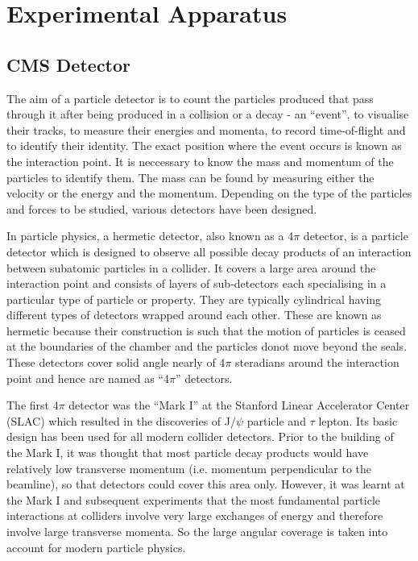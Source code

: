\chapter{Experimental Apparatus}
\label{chap:detector}
\section{CMS Detector}
The aim of a particle detector is to count the particles produced that pass through it after being produced in a collision or a decay - an ``event'', to visualise their tracks, to measure their energies and momenta, to record time-of-flight and to identify their identity. The exact position where the event occurs is known as the interaction point. It is neccessary to know the mass and momentum of the particles to identify them. The mass can be found by measuring either the velocity or the energy and the momentum. Depending on the type of the particles and forces to be studied, various detectors have been designed.

In particle physics, a hermetic detector, also known as a 4$\pi$ detector, is a particle detector which is designed to observe all possible decay products of an interaction between subatomic particles in a collider. It covers a large area around the interaction point and  consists of layers of sub-detectors each specialising in a particular type of particle or property. They are typically cylindrical having different types of detectors wrapped around each other. These are known as hermetic because their construction is such that the motion of particles is ceased at the boundaries of the chamber and the particles donot move beyond the seals. These detectors cover solid angle nearly of 4$\pi$ steradians around the interaction point and hence are named as ``4$\pi$'' detectors.

The first 4$\pi$ detector was the ``Mark I'' at the Stanford Linear Accelerator Center (SLAC) which resulted in the discoveries of J/$\psi$ particle and $\tau$ lepton. Its basic design has been used for all modern collider detectors. Prior to the building of the Mark I, it was thought that most particle decay products would have relatively low transverse momentum (i.e. momentum perpendicular to the beamline), so that detectors could cover this area only. However, it was learnt at the Mark I and subsequent experiments that the most fundamental particle interactions at colliders involve very large exchanges of energy and therefore involve large transverse momenta. So the large angular coverage is taken into account for modern particle physics.

